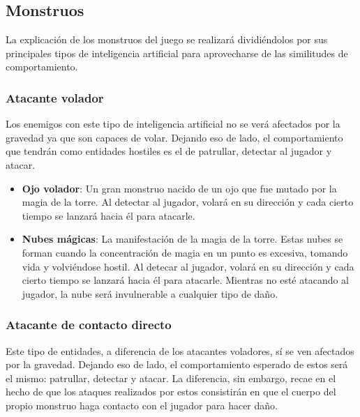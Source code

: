 \subsection{Monstruos}


La explicación de los monstruos del juego se realizará dividiéndolos por sus
principales tipos de inteligencia artificial para aprovecharse de las
similitudes de comportamiento.

\subsubsection{Atacante volador} %

Los enemigos con este tipo de inteligencia artificial no se verá afectados por
la gravedad ya que son capaces de volar. Dejando eso de lado, el comportamiento
que tendrán como entidades hostiles es el de patrullar, detectar al jugador y
atacar.

\begin{itemize}
    \item \textbf{Ojo volador}: Un gran monstruo nacido de un ojo que fue mutado
    por la magia de la torre. Al detectar al jugador, volará en su dirección y
    cada cierto tiempo se lanzará hacia él para atacarle.
    \item \textbf{Nubes mágicas}: La manifestación de la magia de la torre.
    Estas nubes se forman cuando la concentración de magia en un punto es
    excesiva, tomando vida y volviéndose hostil. Al detecar al jugador, volará
    en su dirección y cada cierto tiempo se lanzará hacia él para atacarle.
    Mientras no esté atacando al jugador, la nube será invulnerable a cualquier
    tipo de daño.
\end{itemize}

\subsubsection{Atacante de contacto directo}

Este tipo de entidades, a diferencia de los atacantes voladores, sí se ven
afectados por la gravedad. Dejando eso de lado, el comportamiento esperado de
estos será el mismo: patrullar, detectar y atacar. La diferencia, sin embargo,
recae en el hecho de que los ataques realizados por estos consistirán en que el
cuerpo del propio monstruo haga contacto con el jugador para hacer daño.

